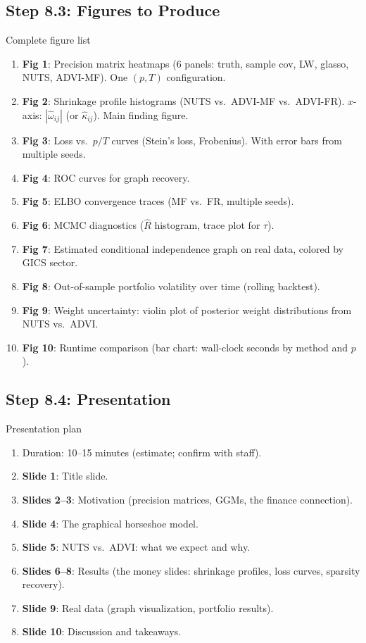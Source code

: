 \documentclass[11pt,a4paper]{article}
\begin{document}
\subsection{Step 8.3: Figures to Produce}

\begin{action}{Complete figure list}
\begin{enumerate}
  \item \textbf{Fig 1}: Precision matrix heatmaps (6 panels: truth, sample cov, LW, glasso, NUTS, ADVI-MF). One $(p,T)$ configuration.
  \item \textbf{Fig 2}: Shrinkage profile histograms (NUTS vs.\ ADVI-MF vs.\ ADVI-FR). $x$-axis: $|\hat\omega_{ij}|$ (or $\hat\kappa_{ij}$). Main finding figure.
  \item \textbf{Fig 3}: Loss vs.\ $p/T$ curves (Stein's loss, Frobenius). With error bars from multiple seeds.
  \item \textbf{Fig 4}: ROC curves for graph recovery.
  \item \textbf{Fig 5}: ELBO convergence traces (MF vs.\ FR, multiple seeds).
  \item \textbf{Fig 6}: MCMC diagnostics ($\hat{R}$ histogram, trace plot for $\tau$).
  \item \textbf{Fig 7}: Estimated conditional independence graph on real data, colored by GICS sector.
  \item \textbf{Fig 8}: Out-of-sample portfolio volatility over time (rolling backtest).
  \item \textbf{Fig 9}: Weight uncertainty: violin plot of posterior weight distributions from NUTS vs.\ ADVI.
  \item \textbf{Fig 10}: Runtime comparison (bar chart: wall-clock seconds by method and $p$).
\end{enumerate}
\end{action}

\subsection{Step 8.4: Presentation}

\begin{action}{Presentation plan}
\begin{enumerate}
  \item Duration: 10--15 minutes (estimate; confirm with staff).
  \item \textbf{Slide 1}: Title slide.
  \item \textbf{Slides 2--3}: Motivation (precision matrices, GGMs, the finance connection).
  \item \textbf{Slide 4}: The graphical horseshoe model.
  \item \textbf{Slide 5}: NUTS vs.\ ADVI: what we expect and why.
  \item \textbf{Slides 6--8}: Results (the money slides: shrinkage profiles, loss curves, sparsity recovery).
  \item \textbf{Slide 9}: Real data (graph visualization, portfolio results).
  \item \textbf{Slide 10}: Discussion and takeaways.
\end{enumerate}
\end{action}
\end{document}
